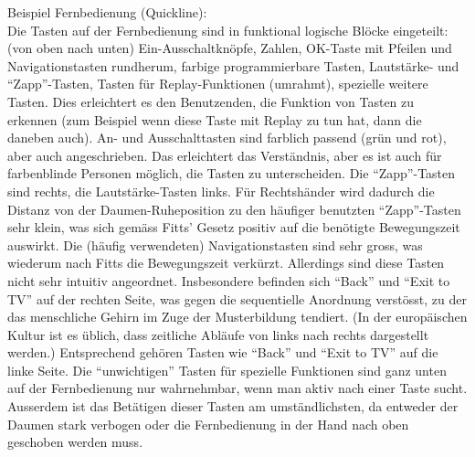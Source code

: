 

Beispiel Fernbedienung (Quickline):\\
Die Tasten auf der Fernbedienung sind in funktional logische Blöcke eingeteilt: 
(von oben nach unten) Ein-Ausschaltknöpfe, Zahlen, 
OK-Taste mit Pfeilen und Navigationstasten rundherum, 
farbige programmierbare Tasten, Lautstärke- und \enquote{Zapp}-Tasten,
Tasten für Replay-Funktionen (umrahmt), 
spezielle weitere Tasten. 
Dies erleichtert es den Benutzenden, 
die Funktion von Tasten zu erkennen (zum Beispiel wenn diese Taste mit Replay zu tun hat, dann die daneben auch).
An- und Ausschalttasten sind farblich passend (grün und rot), aber auch angeschrieben. 
Das erleichtert das Verständnis, aber es ist auch für farbenblinde Personen möglich, die Tasten zu unterscheiden.
Die \enquote{Zapp}-Tasten sind rechts, die Lautstärke-Tasten links. 
Für Rechtshänder wird dadurch die Distanz von der Daumen-Ruheposition zu den häufiger benutzten \enquote{Zapp}-Tasten sehr klein, 
was sich gemäss Fitts' Gesetz positiv auf die benötigte Bewegungszeit auswirkt.
Die (häufig verwendeten) Navigationstasten sind sehr gross,
was wiederum nach Fitts die Bewegungszeit verkürzt.
Allerdings sind diese Tasten nicht sehr intuitiv angeordnet. Insbesondere befinden sich \enquote{Back} und \enquote{Exit to TV} auf der rechten Seite, 
was gegen die sequentielle Anordnung verstösst, 
zu der das menschliche Gehirn im Zuge der Musterbildung tendiert. (In der europäischen Kultur ist es üblich, dass zeitliche Abläufe von links nach rechts dargestellt werden.)
Entsprechend gehören Tasten wie \enquote{Back} und \enquote{Exit to TV} auf die linke Seite.
Die \enquote{unwichtigen} Tasten für spezielle Funktionen sind ganz unten auf der Fernbedienung nur wahrnehmbar, wenn man aktiv nach einer Taste sucht. 
Ausserdem ist das Betätigen dieser Tasten am umständlichsten, da entweder der Daumen stark verbogen oder die Fernbedienung in der Hand nach oben geschoben werden muss.

